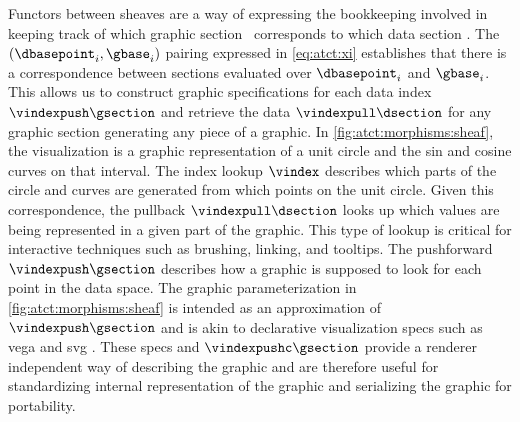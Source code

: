 \documentclass[journal]{IEEEtran}
\theoremstyle{definition}
\theoremstyle{remark}
\begin{document}
Functors between sheaves are a way of expressing the bookkeeping involved in keeping track of which graphic section \gsection\ corresponds to which data section \dsection. The $(\dbasepoint_i, \gbase_i)$ pairing expressed in \autoref{eq:atct:xi} establishes that there is a correspondence between sections evaluated over $\dbasepoint_i$ and $\gbase_i$. This allows us to construct graphic specifications for each data index $\vindexpush\gsection$ and retrieve the data $\vindexpull\dsection$ for any graphic section generating any piece of a graphic. In \autoref{fig:atct:morphisms:sheaf}, the visualization is a graphic representation of a unit circle and the sin and cosine curves on that interval. The index lookup $\vindex$ describes which parts of the circle and curves are generated from which points on the unit circle. Given this correspondence, the pullback $\vindexpull\dsection$ looks up which values are being represented in a given part of the graphic. This type of lookup is critical for interactive techniques such as brushing, linking, and tooltips\cite{beckerBrushingScatterplots1987}. The pushforward $\vindexpush\gsection$ describes how a graphic is supposed to look for each point in the data space. The graphic parameterization in \autoref{fig:atct:morphisms:sheaf} is intended as an approximation of $\vindexpush\gsection$ and is akin to declarative visualization specs such as vega \cite{satyanarayanDeclarativeInteractionDesign2014} and svg \cite{quintScalable2003}. These specs and $\vindexpushc\gsection$ provide a renderer independent way of describing the graphic and are therefore useful for standardizing internal representation of the graphic and serializing the graphic for portability.
\end{document}
